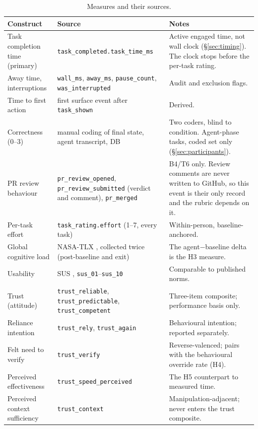 \documentclass[acmsmall,review,screen]{acmart}
\newcommand{\code}[1]{\texttt{#1}}
\begin{document}
\begin{table}[t]
\caption{Measures and their sources.}
\label{tab:measures}
\footnotesize
\begin{tabularx}{\linewidth}{@{}lLL@{}}
\toprule
\textbf{Construct} & \textbf{Source} & \textbf{Notes} \\
\midrule
Task completion time (primary) & \code{task\_completed.task\_time\_ms} &
  Active engaged time, not wall clock (\S\ref{sec:timing}). The clock stops
  before the per-task rating. \\
Away time, interruptions & \code{wall\_ms}, \code{away\_ms},
  \code{pause\_count}, \code{was\_interrupted} & Audit and exclusion flags. \\
Time to first action & first surface event after \code{task\_shown} & Derived. \\
Correctness (0--3) & manual coding of final state, agent transcript, DB &
  Two coders, blind to condition. Agent-phase tasks, coded set only
  (\S\ref{sec:participants}). \\
PR review behaviour & \code{pr\_review\_opened}, \code{pr\_review\_submitted}
  (verdict and comment), \code{pr\_merged} & B4/T6 only. Review comments are
  never written to GitHub, so this event is their only record and the rubric
  depends on it. \\
Per-task effort & \code{task\_rating.effort} (1--7, every task) &
  Within-person, baseline-anchored. \\
Global cognitive load & NASA-TLX \cite{hart1988nasatlx}, collected twice
  (post-baseline and exit) & The agent$-$baseline delta is the H3 measure. \\
Usability & SUS \cite{brooke1996sus}, \code{sus\_01}--\code{sus\_10} &
  Comparable to published norms. \\
Trust (attitude) & \code{trust\_reliable}, \code{trust\_predictable},
  \code{trust\_competent} & Three-item composite; performance basis only. \\
Reliance intention & \code{trust\_rely}, \code{trust\_again} &
  Behavioural intention; reported separately. \\
Felt need to verify & \code{trust\_verify} & Reverse-valenced; pairs with the
  behavioural override rate (H4). \\
Perceived effectiveness & \code{trust\_speed\_perceived} & The H5 counterpart
  to measured time. \\
Perceived context sufficiency & \code{trust\_context} & Manipulation-adjacent;
  never enters the trust composite. \\

\end{tabularx}
\end{table}
\end{document}
